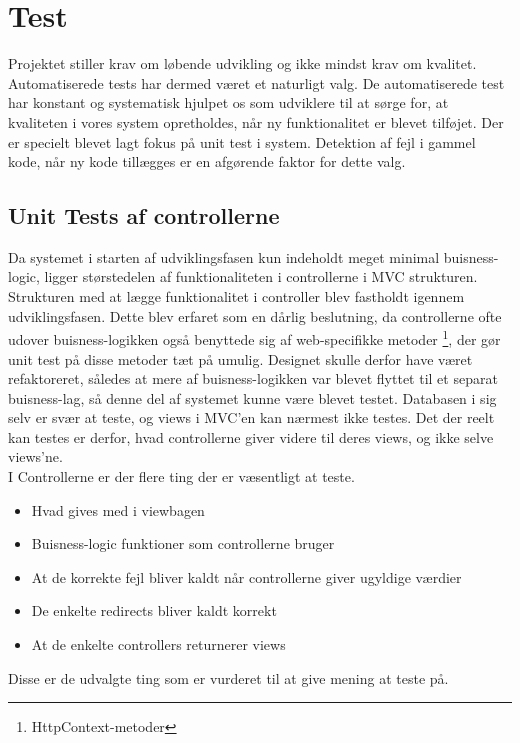 \chapter{Test}

Projektet stiller krav om løbende udvikling og ikke mindst krav om kvalitet. 
Automatiserede tests har dermed været et naturligt valg. De automatiserede test har konstant og systematisk hjulpet os som udviklere til at sørge for, at kvaliteten i vores system opretholdes, når ny funktionalitet er blevet tilføjet. Der er specielt blevet lagt fokus på unit test i system. Detektion af fejl i gammel kode, når ny kode tillægges er en afgørende faktor for dette valg.



\section{Unit Tests af controllerne}
Da systemet i starten af udviklingsfasen kun indeholdt meget minimal buisness-logic, ligger størstedelen af funktionaliteten i controllerne i MVC strukturen. 
Strukturen med at lægge funktionalitet i controller blev fastholdt igennem udviklingsfasen. Dette blev erfaret som en dårlig beslutning, da controllerne ofte udover buisness-logikken også benyttede sig af web-specifikke metoder \footnote{HttpContext-metoder}, der gør unit test på disse metoder tæt på umulig. Designet skulle derfor have været refaktoreret, således at mere af buisness-logikken var blevet flyttet til et separat buisness-lag, så denne del af systemet kunne være blevet testet.
Databasen i sig selv er svær at teste, og views i MVC'en kan nærmest ikke testes. Det der reelt kan testes er derfor, hvad controllerne giver videre til deres views, og ikke selve views'ne.\\ I Controllerne er der flere ting der er væsentligt at teste.
\begin{itemize}
	\item Hvad gives med i viewbagen
	\item Buisness-logic funktioner som controllerne bruger
	\item At de korrekte fejl bliver kaldt når controllerne giver ugyldige værdier
	\item De enkelte redirects bliver kaldt korrekt
	\item At de enkelte controllers returnerer views
\end{itemize}       
Disse er de udvalgte ting som er vurderet til at give mening at teste på.

